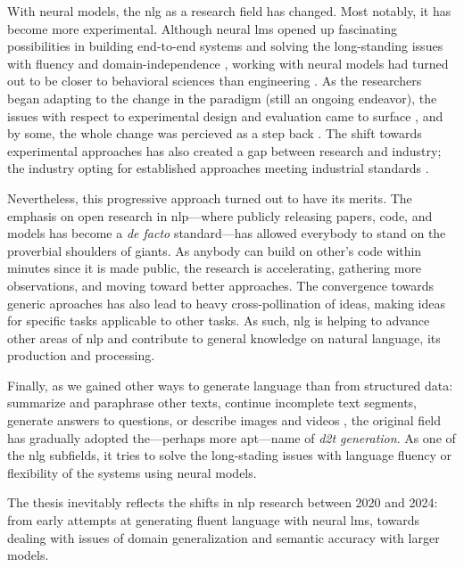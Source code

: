 With neural models, the  \ac{nlg} as a research field has changed. Most notably, it has become more experimental. Although neural \acp{lm} opened up fascinating possibilities in building end-to-end systems and solving the long-standing issues with fluency and domain-independence \cite{ferreiraNeuralDatatotextGeneration2019,dusekEvaluatingStateoftheartEndtoEnd2020,sharmaInnovationsNeuralDatatotext2022}, working with neural models had turned out to be closer to behavioral sciences than engineering \cite{holtzmanGenerativeModelsComplex2023}. As the researchers began adapting to the change in the paradigm (still an ongoing endeavor), the issues with respect to experimental design and evaluation came to surface \cite{gehrmannRepairingCrackedFoundation2022}, and by some, the whole change was percieved as a step back \cite{reiter2020academic}. The shift towards experimental approaches has also created a gap between research and industry; the industry opting for established approaches meeting industrial standards
\cite{daleNaturalLanguageGeneration2020,daleNavigatingTextGeneration2023}.


Nevertheless, this progressive approach turned out to have its merits. The emphasis on open research in \ac{nlp}---where publicly releasing papers, code, and models has become a \emph{de facto} standard---has allowed everybody to stand on the proverbial shoulders of giants. As anybody can build on other's code within minutes since it is made public, the research is accelerating, gathering more observations, and moving toward better approaches. The convergence towards generic aproaches has also lead to heavy cross-pollination of ideas, making ideas for specific tasks applicable to other tasks. As such, \ac{nlg} is helping to advance other areas of \ac{nlp} and contribute to general knowledge on natural language, its production and processing.

Finally, as we gained other ways to generate language than from structured data: summarize and paraphrase other texts, continue incomplete text segments, generate answers to questions, or describe images and videos \cite{Dong2021ASO}, the original field has gradually adopted the---perhaps more apt---name of \emph{\ac{d2t} generation}. As one of the \ac{nlg} subfields, it tries to solve the long-stading issues with language fluency or flexibility of the systems using neural models.

The thesis inevitably reflects the shifts in \ac{nlp} research between 2020 and 2024: from early attempts at generating fluent language with neural \acp{lm}, towards dealing with issues of domain generalization and semantic accuracy with larger models.

